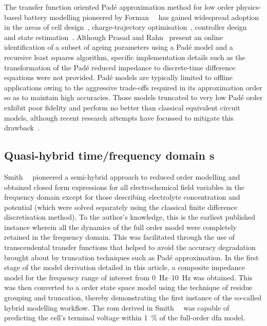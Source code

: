 The     transfer     function     oriented    Padé     approximation     method
for    low    order    physics-based     battery    modelling    pioneered    by
Forman~\etal{}~\cite{Forman2011a}    has   gained    widespread   adoption    in
the    areas     of    cell     design~\cite{Marcicki2013},    charge-trajectory
optimisation~\cite{Bashash2010},    controller    design~\cite{Perez2015}    and
state    estimation~\cite{Marcicki2013,Moura2012}.     Although    Prasad    and
Rahn~\cite{Prasad2013} present  an online identification  of a subset  of ageing
parameters  using  a  Padé  model  and a  recursive  least  squares  algorithm,
specific  implementation  details  such  as  the  transformation  of  the  Padé
reduced  impedance  to discrete-time  difference  equations  were not  provided.
Padé  models  are  typically  limited  to offline  applications  owing  to  the
aggressive  trade-offs required  in its  approximation order  so as  to maintain
high  accuracies.  Those  models  truncated  to very  low  Padé  order  exhibit
poor  fidelity  and   perform  no  better  than   classical  equivalent  circuit
models,  although  recent  research  attempts have  focussed  to  mitigate  this
drawback~\cite{Yuan2017a,Yuan2017}.


\subsection{Quasi-hybrid time/frequency domain s}

Smith~\etal{}~\cite{Smith2007} pioneered a semi-hybrid approach to reduced order
modelling and  obtained closed  form expressions  for all  electrochemical field
variables  in  the frequency  domain  except  for those  describing  electrolyte
concentration and  potential (which were  solved separately using  the classical
finite difference discretisation method). To the author's knowledge, this is the
earliest published  instance wherein all  the dynamics  of the full  order model
were completely retained  in the frequency domain. This  was facilitated through
the use of  transcendental transfer functions that helped to  avoid the accuracy
degradation brought about by truncation  techniques such as Padé approximation.
In the first  stage of the model  derivation detailed in this  article, a composite
impedance model for the frequency range of interest from \SIrange{0}{10}{\hertz}
was  obtained.  This was  then  converted  to  a   order  state
space  model using  the technique  of residue  grouping and  truncation, thereby
demonstrating the first instance of the so-called hybrid modelling workflow. The
\gls{rom} derived  in Smith~\etal{}~\cite{Smith2007}  was capable  of predicting
the cell's terminal voltage within  \SI{1}{\percent} of the full-order \gls{dfn}
model.


